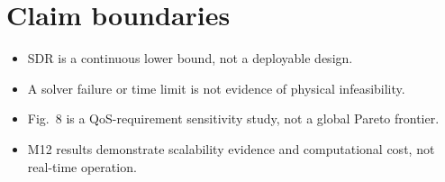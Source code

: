 \section{Claim boundaries}
\begin{itemize}
\item SDR is a continuous lower bound, not a deployable design.
\item A solver failure or time limit is not evidence of physical infeasibility.
\item Fig.~8 is a QoS-requirement sensitivity study, not a global Pareto frontier.
\item M12 results demonstrate scalability evidence and computational cost, not real-time operation.
\end{itemize}

